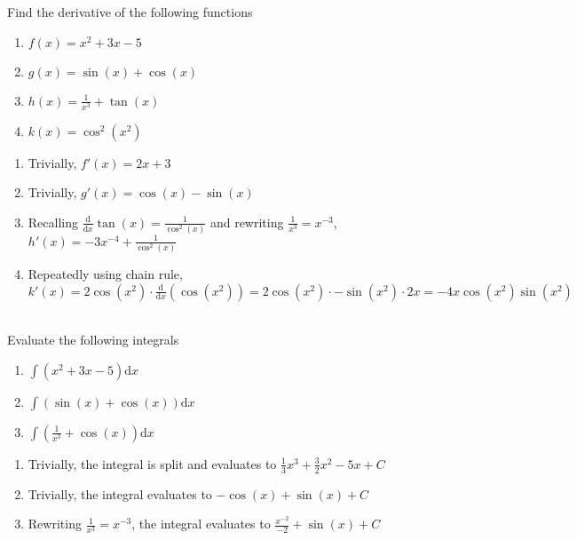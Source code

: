 \documentclass[12pt]{article}
\begin{document}
\noindent Find the derivative of the following functions

\begin{enumerate}[start=1,label={\bfseries Question \arabic*:},leftmargin=1in]
    \item $f(x) = x^2 + 3x - 5$
    \item $g(x) = \sin(x) + \cos(x)$
    \item $h(x) = \frac{1}{x^3} + \tan(x)$
    \item $k(x) = \cos^2(x^2)$
\end{enumerate}

\begin{enumerate}[start=1,label={\bfseries Solution \arabic*:},leftmargin=1in]
    \item Trivially, $f'(x) = 2x + 3$
    \item Trivially, $g'(x) = \cos(x) - \sin(x)$
    \item Recalling $\frac{\mathrm{d}}{\mathrm{d}x} \tan(x) = \frac{1}{\cos^2(x)}$ and rewriting $\frac{1}{x^3} = x^{-3}$, $h'(x) = -3x^{-4} + \frac{1}{\cos^2(x)}$
    \item Repeatedly using chain rule, $k'(x) = 2\cos(x^2) \cdot \frac{\mathrm{d}}{\mathrm{d}x} (\cos(x^2)) = 2\cos(x^2) \cdot -\sin(x^2) \cdot 2x = -4x\cos(x^2)\sin(x^2)$
\end{enumerate}

\noindent \\Evaluate the following integrals

\begin{enumerate}[start=1,label={\bfseries Question \arabic*:},leftmargin=1in]
    \item $\int (x^2 + 3x - 5) \mathrm{d}x$
    \item $\int (\sin(x) + \cos(x)) \mathrm{d}x$
    \item $\int (\frac{1}{x^3} + \cos(x)) \mathrm{d}x$
\end{enumerate}

\begin{enumerate}[start=1,label={\bfseries Solution \arabic*:},leftmargin=1in]
    \item Trivially, the integral is split and evaluates to $\frac{1}{3} x^3 + \frac{3}{2} x^2 - 5x + C$
    \item Trivially, the integral evaluates to $-\cos(x) + \sin(x) + C$
    \item Rewriting $\frac{1}{x^3} = x^{-3}$, the integral evaluates to $\frac{x^{-2}}{-2} + \sin(x) + C$
\end{enumerate}
\end{document}
